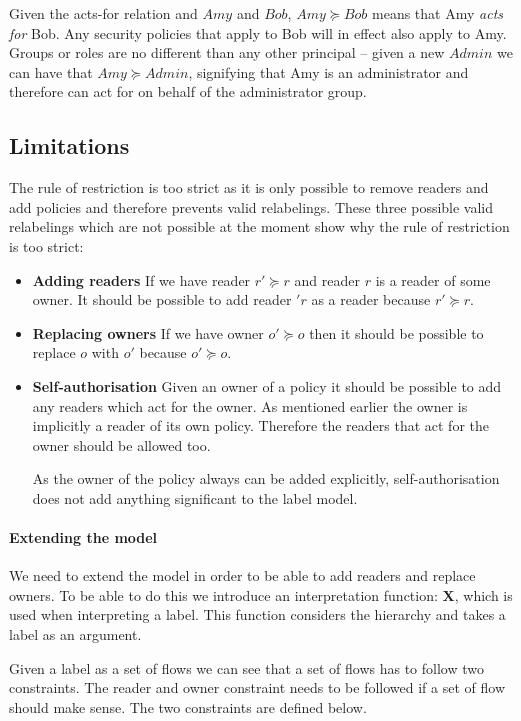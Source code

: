 Given the acts-for relation and \principals{} $Amy$ and $Bob$, $Amy \succeq Bob$ means that Amy \textit{acts for} Bob.
Any security policies that apply to Bob will in effect also apply to Amy.
Groups or roles are no different than any other principal -- given a new \principal{} $Admin$ we can have that $Amy \succeq Admin$, signifying that Amy is an administrator and therefore can act for on behalf of the administrator group.

\subsection{Limitations}
The rule of restriction is too strict as it is only possible to remove readers and add policies and therefore prevents valid relabelings.
These three possible valid relabelings which are not possible at the moment show why the rule of restriction is too strict:

\begin{itemize}
\item \textbf{Adding readers}
If we have reader $r' \succeq r$ and reader $r$ is a reader of some owner.
It should be possible to add reader $'r$ as a reader because $r' \succeq r$.

\item \textbf{Replacing owners}
If we have owner $o' \succeq o$ then it should be possible to replace $o$ with $o'$ because $o' \succeq o$.

\item \textbf{Self-authorisation}
Given an owner of a policy it should be possible to add any readers which act for the owner.
As mentioned earlier the owner is implicitly a reader of its own policy.
Therefore the readers that act for the owner should be allowed too.

As the owner of the policy always can be added explicitly, self-authorisation does not add anything significant to the label model.
\end{itemize}


\paragraph{Extending the model}
We need to extend the model in order to be able to add readers and replace owners.
To be able to do this we introduce an interpretation function: $\textbf{X}$, which is used when interpreting a label.
This function considers the \principal{} hierarchy and takes a label as an argument.

Given a label as a set of flows we can see that a set of flows has to follow two constraints.
The reader and owner constraint needs to be followed if a set of flow should make sense.
The two constraints are defined below.

